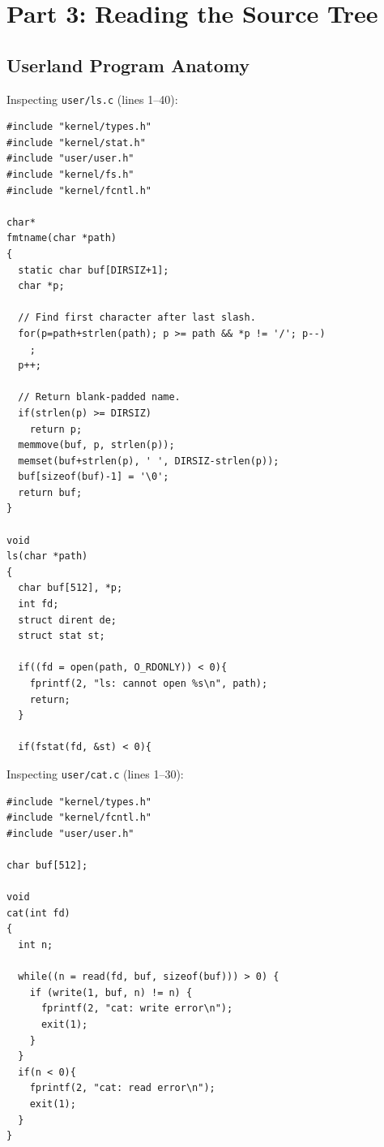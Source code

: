 \documentclass[12pt,a4paper]{article}
\begin{document}
\section{Part 3: Reading the Source Tree}

\subsection{Userland Program Anatomy}
Inspecting \texttt{user/ls.c} (lines 1--40):
\begin{lstlisting}[style=cstyle]
#include "kernel/types.h"
#include "kernel/stat.h"
#include "user/user.h"
#include "kernel/fs.h"
#include "kernel/fcntl.h"

char*
fmtname(char *path)
{
  static char buf[DIRSIZ+1];
  char *p;

  // Find first character after last slash.
  for(p=path+strlen(path); p >= path && *p != '/'; p--)
    ;
  p++;

  // Return blank-padded name.
  if(strlen(p) >= DIRSIZ)
    return p;
  memmove(buf, p, strlen(p));
  memset(buf+strlen(p), ' ', DIRSIZ-strlen(p));
  buf[sizeof(buf)-1] = '\0';
  return buf;
}

void
ls(char *path)
{
  char buf[512], *p;
  int fd;
  struct dirent de;
  struct stat st;

  if((fd = open(path, O_RDONLY)) < 0){
    fprintf(2, "ls: cannot open %s\n", path);
    return;
  }

  if(fstat(fd, &st) < 0){
\end{lstlisting}

Inspecting \texttt{user/cat.c} (lines 1--30):
\begin{lstlisting}[style=cstyle]
#include "kernel/types.h"
#include "kernel/fcntl.h"
#include "user/user.h"

char buf[512];

void
cat(int fd)
{
  int n;

  while((n = read(fd, buf, sizeof(buf))) > 0) {
    if (write(1, buf, n) != n) {
      fprintf(2, "cat: write error\n");
      exit(1);
    }
  }
  if(n < 0){
    fprintf(2, "cat: read error\n");
    exit(1);
  }
}
\end{lstlisting}
\end{document}

